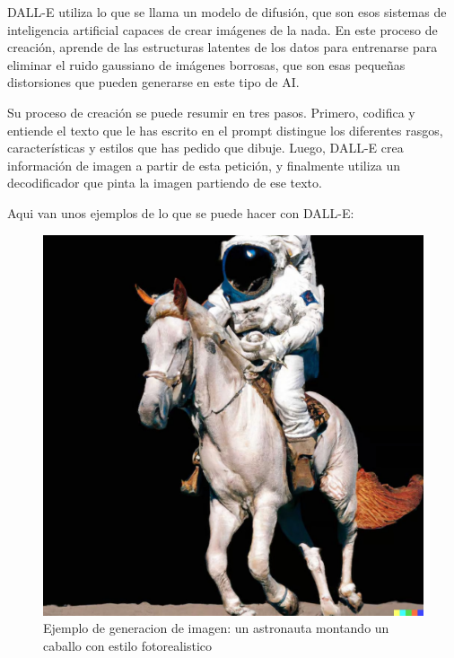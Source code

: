 \documentclass[runningheads]{llncs} %
\begin{document}
DALL-E utiliza lo que se llama un modelo de difusión, que son esos sistemas 
de inteligencia artificial capaces de crear imágenes de la nada. 
En este proceso de creación, aprende de las estructuras latentes de los datos 
para entrenarse para eliminar el ruido gaussiano de imágenes borrosas, 
que son esas pequeñas distorsiones que pueden generarse en este tipo de AI. 
\cite{dalle-xtaka}

Su proceso de creación se puede resumir en tres pasos. 
Primero, codifica y entiende el texto que le has escrito en el prompt 
distingue los diferentes rasgos, características y estilos que has pedido que dibuje.
Luego, DALL-E crea información de imagen a partir de esta petición, y finalmente 
utiliza un decodificador que pinta la imagen partiendo de ese texto. \cite{dalle-xtaka}

Aqui van unos ejemplos de lo que se puede hacer con DALL-E:

\begin{figure}
    \centering
    \includegraphics[scale=0.19]{ej1-dalle.jpg}
    \caption{Ejemplo de generacion de imagen: un astronauta montando un
    caballo con estilo fotorealistico \cite{ej-dalle}}
    \label{fig:dalle-ej1}
\end{figure}
\end{document}
